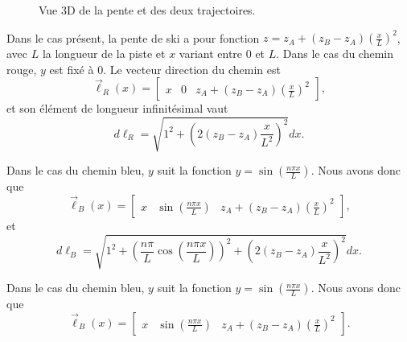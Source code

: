 \documentclass{cup-pan}
\begin{document}
\begin{figure}[H]
    \caption{Vue 3D de la pente et des deux trajectoires.}
    \label{fig:pente3darea}
\end{figure}

Dans le cas présent, la pente de ski a pour fonction $z=z_A + (z_B - z_A)\left(\frac{x}{L}\right)^2$, avec $L$ la longueur de la piste et $x$ variant entre 0 et $L$. Dans le cas du chemin rouge, $y$ est fixé à 0. Le vecteur direction du chemin est
\begin{equation}
    \vec{\ell}_R(x) = \begin{bmatrix}x & 0 & z_A + (z_B - z_A)\left(\frac{x}{L}\right)^2 \end{bmatrix},
\end{equation}
et son élément de longueur infinitésimal vaut
\begin{equation}
    d\ell_R = \sqrt{1^2 + \left(2(z_B - z_A)\frac{x}{L^2}\right)^2} dx.
\end{equation}

Dans le cas du chemin bleu, $y$ suit la fonction $y=\sin\left(\frac{n\pi x}{L}\right)$. Nous avons donc que
\begin{equation}
    \vec{\ell}_B(x) = \begin{bmatrix}x & \sin\left(\frac{n\pi x}{L}\right) & z_A + (z_B - z_A)\left(\frac{x}{L}\right)^2 \end{bmatrix},
\end{equation}
et
\begin{equation}
    d\ell_B = \sqrt{1^2 + \left(\frac{n\pi }{L}\cos\left(\frac{n\pi x}{L}\right)\right)^2 + \left(2(z_B - z_A)\frac{x}{L^2}\right)^2} dx.
\end{equation}

Dans le cas du chemin bleu, $y$ suit la fonction $y=\sin\left(\frac{n\pi x}{L}\right)$. Nous avons donc que
\begin{equation}
    \vec{\ell}_B(x) = \begin{bmatrix}x & \sin\left(\frac{n\pi x}{L}\right) & z_A + (z_B - z_A)\left(\frac{x}{L}\right)^2 \end{bmatrix}.
\end{equation}
\end{document}
